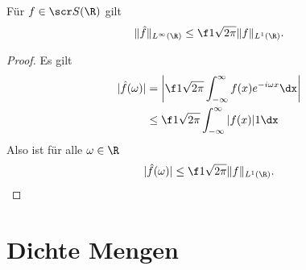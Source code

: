 \begin{st} \label{4.17}
	Für $f \in \scr S(\R)$ gilt
	\[
		\| \hat f \|_{L^\infty(\R)} \le \f 1{\sqrt{2\pi}} \|f\|_{L^1(\R)}.
	\]
	\begin{proof}
		Es gilt
		\begin{align*}
			|\hat f(\omega)|
			&= \bigg| \f 1{\sqrt{2\pi}} \int_{-\infty}^\infty f(x) e^{-i\omega x} \dx \bigg| \\
			&\le \f 1{\sqrt{2\pi}} \int_{-\infty}^\infty |f(x)| 1 \dx
		\end{align*}
		Also ist für alle $\omega \in \R$
		\[
			|\hat f(\omega)| \le \f 1{\sqrt{2\pi}} \|f\|_{L^1(\R)}.
		\]
	\end{proof}
\end{st}


\section{Dichte Mengen}


